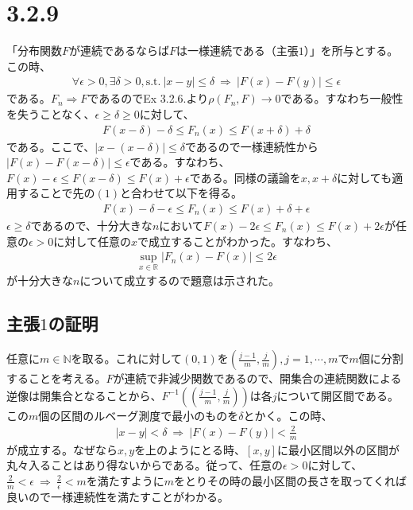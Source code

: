 \documentclass{article}
\begin{document}
\section{3.2.9}
「分布関数$F$が連続であるならば$F$は一様連続である（主張$1$）」を所与とする。この時、
\begin{align*}
	\forall \epsilon > 0, \exists \delta > 0, \text{s.t.}\ |x-y| \leq \delta\ \Rightarrow\ \left| F(x) - F(y) \right| \leq \epsilon
\end{align*}
である。$F_n \Rightarrow F$であるのでEx 3.2.6.より$\rho\left( F_n, F \right) \to 0$である。すなわち一般性を失うことなく、$\epsilon \geq \delta \geq 0$に対して、
\begin{align}
	F\left( x-\delta \right) -\delta \leq F_n(x) \leq F(x + \delta) + \delta
\end{align}
である。ここで、$|x - (x-\delta)| \leq \delta$であるので一様連続性から$\left| F(x) - F(x-\delta) \right| \leq \epsilon$である。すなわち、$F(x) - \epsilon \leq F(x - \delta) \leq F(x) + \epsilon$である。同様の議論を$x, x+\delta$に対しても適用することで先の$(1)$と合わせて以下を得る。
\begin{align*}
	F(x) - \delta - \epsilon \leq F_n(x) \leq F(x) + \delta + \epsilon
\end{align*}
$\epsilon \geq \delta$であるので、十分大きな$n$において$F(x) - 2\epsilon \leq F_n(x) \leq F(x)+ 2\epsilon$が任意の$\epsilon > 0$に対して任意の$x$で成立することがわかった。すなわち、
\begin{align*}
	\sup_{x\in \mathbb{R}} \left| F_n(x) - F(x) \right| \leq 2\epsilon
\end{align*}
が十分大きな$n$について成立するので題意は示された。

\subsection{主張$1$の証明}
任意に$m \in \mathbb{N}$を取る。これに対して$(0,1)$を$\left( \frac{j-1}{m}, \frac{j}{m} \right), j = 1,\cdots, m$で$m$個に分割することを考える。$F$が連続で非減少関数であるので、開集合の連続関数による逆像は開集合となることから、$F^{-1}\left( \left( \frac{j-1}{m}, \frac{j}{m} \right) \right)$は各$j$について開区間である。この$m$個の区間のルベーグ測度で最小のものを$\delta$とかく。この時、
\begin{align*}
	|x-y| < \delta\ \Rightarrow\ \left| F(x) - F(y) \right| < \frac{2}{m}
\end{align*}
が成立する。なぜなら$x,y$を上のようにとる時、$[x, y]$に最小区間以外の区間が丸々入ることはあり得ないからである。従って、任意の$\epsilon > 0$に対して、$\frac{2}{m} < \epsilon\ \Rightarrow\ \frac{2}{\epsilon} < m$を満たすように$m$をとりその時の最小区間の長さを取ってくれば良いので一様連続性を満たすことがわかる。
\end{document}
